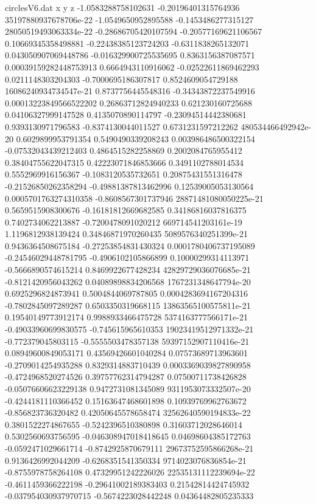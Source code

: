 \begin{filecontents}{circlesV6.dat}
x y z
-1.0583288758102631	-0.20196401315764936	35197880937678706e-22
-1.0549650952895588	-0.1453486277315127	28050519493063334e-22
-0.28686705420107594	-0.20577169621106567	0.10669345358498881
-0.22438385123724203	-0.6311838265132071	0.043050907069448786
-0.016329900725535695	0.8363156387087571	0.00039159282448753913
0.6664943110916062	-0.02522611869462293	0.0211148303204303
-0.7000695186307817	0.8524609054729188	16086240934734547e-21
0.8737756445548316	-0.34343872237549916	0.00013223849566522202
0.26863712824940233	0.621230160725688	0.04106327999147528
0.4135070890114797	-0.23094514442380681	0.9393130971796583
-0.8374130044011527	0.6731231597212262	480534466492942e-20
0.6029899953791354	0.5490490339208243	0.003986486500322154
-0.07532043439212403	0.4864515282258869	0.2002084765955412
0.38404755622047315	0.42223071846853666	0.3491102788014534
0.5552969916156367	-0.1083120535732651	0.20875431551316478
-0.21526850262358294	-0.49881387813462996	0.12539005053130564
0.0005701763274310358	-0.8608567301737946	28871481080050225e-21
0.5659515908300676	-0.16181812669682585	0.34186816037816375
0.7402734062213887	-0.7200478091020212	669714541203161e-19
1.1196812938139424	0.34846871970260435	5089576340251399e-21
0.9436364508675184	-0.27253854831430324	0.0001780406737195089
-0.24546029448781795	-0.4906102105866899	0.10000299314113971
-0.5666890574615214	0.8469922677428234	42829729036076685e-21
-0.8121420956043262	0.04089898834206568	1767231348647794e-20
0.6925296824873941	0.5004844069787805	0.0004283694167204316
-0.7802845097289287	0.6503350319668115	13863565100575811e-21
0.19540149773912174	0.9988933466475728	5374163777566171e-21
-0.49033960699830575	-0.745615965610353	19023419512971332e-21
-0.772379045803115	-0.5555503478357138	59397152907110416e-21
0.08949600849053171	0.43569426601040284	0.07573689713963601
-0.2709014254935288	0.8329314883710439	0.0003369039827890958
-0.4724968520274526	0.39757762314794287	0.07500711738426828
-0.05076606623229138	0.9472731081345089	9311953073332507e-20
-0.4244181110366452	0.15163647468601898	0.10939769962763672
-0.856823736320482	0.42050645578658474	32562640590194833e-22
0.3801522274867655	-0.5242396510380898	0.31603712028646014
0.5302560693756595	-0.046308947018418645	0.04698604385172763
-0.0592471029661714	-0.8742925870679111	29673752595866268e-21
0.9136426992044209	-0.6268351541350334	9714023076836854e-21
-0.8755978758264108	0.47329951242226026	22535131112239694e-22
-0.4611459366222198	-0.29641002189383403	0.21542814424745932
-0.037954030937970715	-0.5674223028442248	0.04364482805235333

\end{filecontents}
